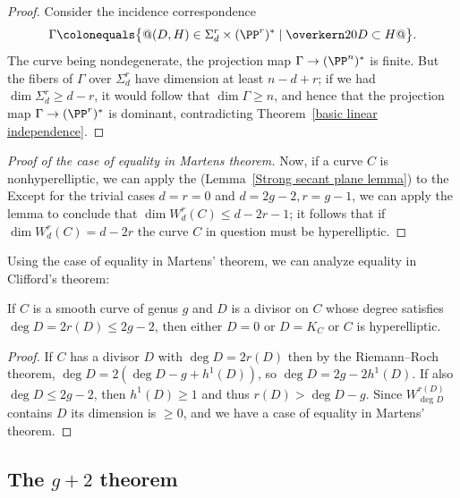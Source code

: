 \begin{proof}
Consider the incidence correspondence
$$
\Gamma \colonequals  \bigl\{@(D, H) \in \Sigma^r_d\times 
(\PP^r)^*
\mid \overkern20 D \subset H@\bigr\}.
$$
The curve being nondegenerate, the projection map $\Gamma \to  (\PP^n)^*$
is finite. But the fibers of $\Gamma$ over $\Sigma^r_d$ have dimension
at least $n-d+r$; if we had $\dim \Sigma^r_d \geq d-r$, it would follow
that $\dim \Gamma \geq n$, and hence that the projection map $\Gamma
\to  (\PP^r)^*$ is dominant, contradicting Theorem~\ref{basic
linear independence}.
\end{proof}

\begin{proof}[Proof of the case of equality in Martens theorem]
 Now, if a curve $C$ is nonhyperelliptic, we can apply the 
%
(Lemma~\ref{Strong secant plane lemma})
 to the 
%
Except for the trivial cases $d=r=0$
 and $d=2g-2, r=g-1$,
 we can apply 
the lemma
to conclude that
 $\dim W^r_d(C) \leq d-2r-1$; it follows that if 
$\dim W^r_d(C)
 = d-2r$ the curve $C$ in question must be hyperelliptic.
\unif
\end{proof}

Using the case of equality in Martens' theorem, we can analyze equality in
Clifford's theorem:
%

\begin{corollary}\label{equality in Clifford from Martens}
If $C$ is a smooth curve of genus $g$ and $D$ 
is
a divisor on $C$ 
whose degree satisfies $\deg D = 2r(D)\le 2g-2$,
then either $D =0$ or $D=K_C$ or $C$
is hyperelliptic.
\unif
\end{corollary}

\begin{proof}
If $C$ has a divisor $D$ with $\deg D =2 r(D)$ then by the Riemann--Roch
theorem,  $\deg D  = 2(\deg D-g+h^1(D))$,
so $\deg D = 2g-2h^1(D)$. If also $\deg D\leq 2g-2$, then $h^1(D) \geq 1$
and thus $r(D) >\deg D-g$. Since $W^{r(D)}_{\deg D}$ contains $D$
its dimension
is $\geq 0$, and we have a case of equality in Martens' theorem.
\end{proof}


\subsection*{The $g+2$ theorem}

